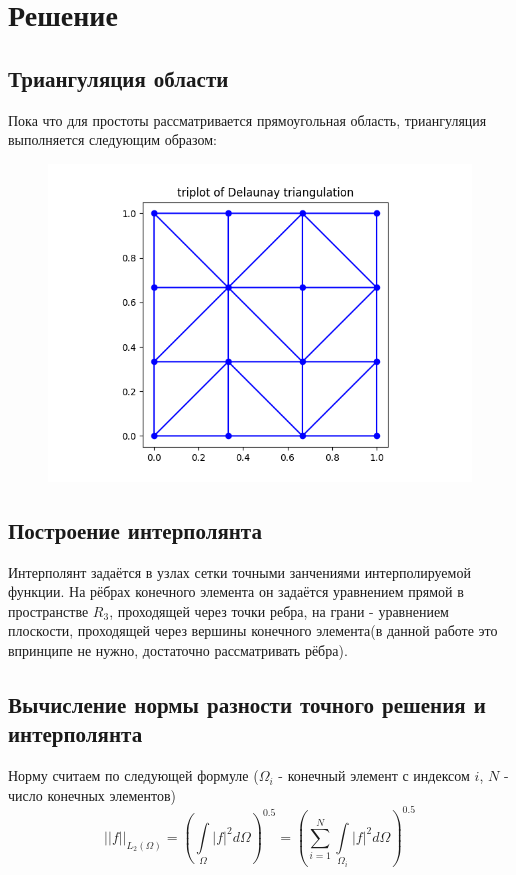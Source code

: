 \documentclass[12pt]{article}
\begin{document}
\section{Решение}
\subsection{Триангуляция области}
Пока что для простоты рассматривается прямоугольная область, триангуляция выполняется следующим образом:

\begin{figure}[H] \label{fig1}
\centerline{\includegraphics[scale = 0.6]{Figure_1.png}}
\end{figure} 


\subsection{Построение интерполянта}
Интерполянт задаётся в узлах сетки точными занчениями интерполируемой функции. На рёбрах конечного элемента он задаётся уравнением прямой в пространстве $R_3$, проходящей через точки ребра, на грани - уравнением плоскости, проходящей через вершины конечного элемента(в данной работе это впринципе не нужно, достаточно рассматривать рёбра).

\subsection{Вычисление нормы разности точного решения и интерполянта}

Норму считаем по следующей формуле
($\Omega_i$ - конечный элемент с индексом $i$, $N$ - число конечных элементов)
$$
||f||_{L_2(\Omega)} = \left(\int\limits_{\Omega}|f|^2d\Omega\right)^{0.5} = \left(\sum_{i=1}^{N}\int\limits_{\Omega_i}|f|^2d\Omega\right)^{0.5}
$$
\end{document}
